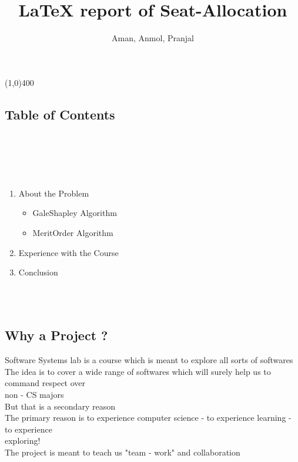 \documentclass{article}
\title{LaTeX report of Seat-Allocation}
\author{Aman, Anmol, Pranjal}
\begin{document}
\maketitle
\begin{center}
\line(1,0){400}
\end{center}
\begin{center}
\section*{Table of Contents}
\end{center}
\hspace*{5 mm} \\
\hspace*{5 mm} \\
\hspace*{5 mm} \\
\hspace*{5 mm} \\
\begin{enumerate}
  \item About the Problem
  	\begin{itemize}
	  \item GaleShapley Algorithm
	  \item MeritOrder Algorithm
	\end{itemize}
  \item Experience with the Course
  \item Conclusion
\end{enumerate}
\hspace*{5 mm} \\
\hspace*{5 mm} \\
\subsection*{Why a Project ?}
\hspace*{5 mm}Software Systems lab is a course which is meant to explore all sorts of softwares \\
\hspace*{5 mm}The idea is to cover a wide range of softwares which will surely help us to command respect over  \\
\hspace*{5 mm}non - CS majors \\
\hspace*{5 mm}But that is a secondary reason \\
\hspace*{5 mm}The primary reason is to experience computer science - to experience learning - to experience \\
\hspace*{5 mm}exploring! \\
\hspace*{5 mm}The project is meant to teach us "team - work" and collaboration \\
\hspace*{5 mm} \\
\hspace*{5 mm} \\
\end{document}
